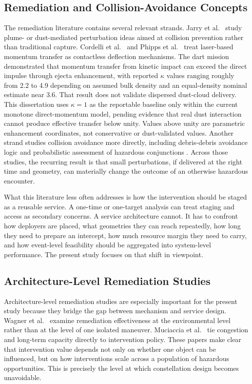 \subsection{Remediation and Collision-Avoidance Concepts}
The remediation literature contains several relevant strands. Jarry et al.\ \cite{JARRY2019185} study plume- or dust-mediated perturbation ideas aimed at collision prevention rather than traditional capture. Cordelli et al.\ \cite{CORDELLI2022612} and Phipps et al.\ \cite{Phipps2011lodr} treat laser-based momentum transfer as contactless deflection mechanisms. The \gls{dart} mission \cite{cheng2023dart} demonstrated that momentum transfer from kinetic impact can exceed the direct impulse through ejecta enhancement, with reported \(\kappa\) values ranging roughly from 2.2 to 4.9 depending on assumed bulk density and an equal-density nominal estimate near 3.6. That result does not validate dispersed dust-cloud delivery. This dissertation uses \(\kappa=1\) as the reportable baseline only within the current monotone direct-momentum model, pending evidence that real dust interaction cannot produce effective transfer below unity. Values above unity are parametric enhancement coordinates, not conservative or dust-validated values. Another strand studies collision avoidance more directly, including debris-debris avoidance logic and probabilistic assessment of hazardous conjunctions \cite{Bonnal2020,MasonStuplMarshallLevit2011,GonzaloColombo2020,RyuBouvierLalani2024}. Across those studies, the recurring result is that small perturbations, if delivered at the right time and geometry, can materially change the outcome of an otherwise hazardous encounter.

What this literature less often addresses is how the intervention should be staged as a reusable service. A one-time or one-target analysis can treat staging and access as secondary concerns. A service architecture cannot. It has to confront how deployers are placed, what geometries they can reach repeatedly, how long they need to prepare an intercept, how much resource margin they need to carry, and how event-level feasibility should be aggregated into system-level performance. The present study focuses on that shift in viewpoint.

\subsection{Architecture-Level Remediation Studies}
Architecture-level remediation studies are especially important for the present study because they bridge the gap between mechanism and service design. Wagner et al.\ \cite{Wagner2024ADR} examine remediation effectiveness at the environmental level rather than at the level of one isolated maneuver. Muciaccia et al.\ \cite{Muciaccia2024LEOCapacity} tie congestion and long-term capacity directly to intervention policy. These papers make clear that intervention value depends not only on whether one object can be influenced, but on how interventions scale across a population of hazardous opportunities. This is precisely the level at which constellation design becomes unavoidable.

